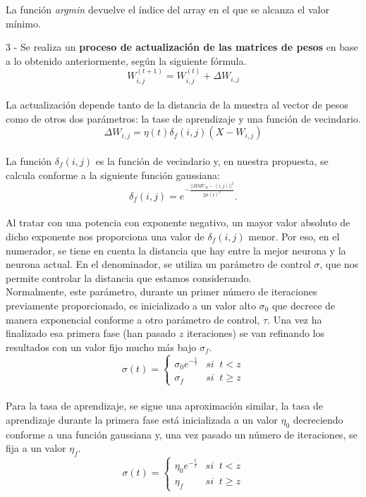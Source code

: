 La función \textit{argmin} devuelve el índice del array en el que se alcanza el valor mínimo.

3 - Se realiza un \textbf{proceso de actualización de las matrices de pesos} en base a lo obtenido anteriormente, según la siguiente fórmula.\\
$$ W_{i, j}^{(t+1)} = W_{i, j}^{(t)} + \Delta {W_{i,j}} $$\\

La actualización depende tanto de la distancia de la muestra al vector de pesos como de otros dos parámetros: la tase de aprendizaje y una función de vecindario.\\

$$\Delta W_{i,j} = \eta(t)\delta_f(i,j)(X-W_{i,j})$$\\

La función $\delta_f(i,j)$ es la función de vecindario y, en nuestra propuesta, se calcula conforme a la siguiente función gaussiana:\\

$$\delta_f(i,j) = e ^{-\frac{||BMU_X-(i,j)||^2}{2\sigma(t)^2}}. $$\\

Al tratar con una potencia con exponente negativo, un mayor valor absoluto de dicho exponente nos proporciona una valor de $\delta_f(i,j)$ menor. Por eso, en el numerador, se tiene en cuenta la distancia que hay entre la mejor neurona y la neurona actual. En el denominador, se utiliza un parámetro de control $\sigma$, que nos permite controlar la distancia que estamos considerando.\\

Normalmente, este parámetro, durante un primer número de iteraciones previamente proporcionado, es inicializado a un valor alto $\sigma_0$ que decrece de manera exponencial conforme a otro parámetro de control, $\tau$. Una vez ha finalizado esa primera fase (han pasado $z$ iteraciones) se van refinando los resultados con un valor fijo mucho más bajo $\sigma_f$.\\


$$\sigma(t) = \left\{
\begin{array}{ll}
\sigma_0e^{-\frac{t}{\tau}} & si \;\;t < z\\
\sigma_f & si  \;\; t\geq z
\end{array}
\right.
$$\\

Para la tasa de aprendizaje, se sigue una aproximación similar, la tasa de aprendizaje durante la primera fase está inicializada a un valor $\eta_0$ decreciendo conforme a una función gaussiana y, una vez pasado un número de iteraciones, se fija a un valor $\eta_f$. \\
$$\sigma(t) = \left\{
\begin{array}{ll}
\eta_0e^{-\frac{t}{\tau}} & si \;\;t < z\\
\eta_f & si  \;\; t\geq z
\end{array}
\right.$$\\

